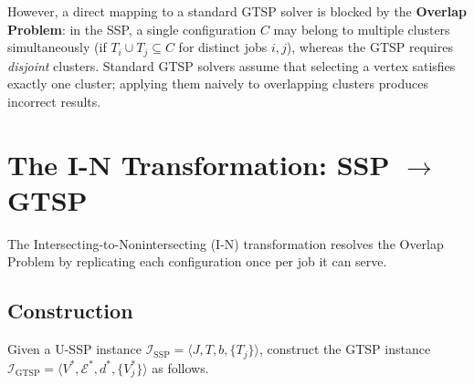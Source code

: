 \documentclass[11pt,a4paper]{article}
\theoremstyle{plain}
\theoremstyle{definition}
\begin{document}
However, a direct mapping to a standard GTSP solver is blocked by the
\textbf{Overlap Problem}: in the SSP, a single configuration $C$ may belong to
multiple clusters simultaneously (if $T_i \cup T_j \subseteq C$ for distinct jobs
$i,j$), whereas the GTSP requires \emph{disjoint} clusters. Standard GTSP solvers
assume that selecting a vertex satisfies exactly one cluster; applying them
naively to overlapping clusters produces incorrect results.

\section{The I-N Transformation: SSP $\to$ GTSP}
\label{sec:in_transform}

The Intersecting-to-Nonintersecting (I-N) transformation \cite{Lien1993} resolves
the Overlap Problem by replicating each configuration once per job it can serve.

\subsection{Construction}

Given a U-SSP instance $\mathcal{I}_{\text{SSP}} = \langle J, T, b, \{T_j\} \rangle$,
construct the GTSP instance $\mathcal{I}_{\text{GTSP}} = \langle V^*, \mathcal{E}^*, d^*, \{V_j^*\} \rangle$ as follows.
\end{document}
